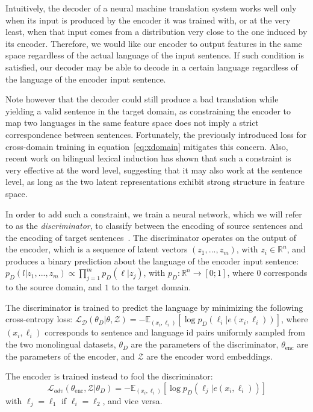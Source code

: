 Intuitively, the decoder of a neural machine translation system works well only when its input is produced by the encoder it was trained with, or at the very least, when that input comes from a distribution very close to the one induced by its encoder. Therefore, we would like our encoder to output features in the same space regardless of the actual language of the input sentence. If such condition is satisfied, our decoder may be able to decode in a certain language regardless of the language of the encoder input sentence.

Note however that the decoder could still produce a bad translation while yielding a valid sentence in the target domain, as constraining the encoder to map two languages in the same feature space does not imply a strict correspondence between sentences. Fortunately, the previously introduced loss for cross-domain training in equation~\ref{eq:xdomain} mitigates this concern. Also, recent work on bilingual lexical induction has shown that such a constraint is very effective at the word level, suggesting that it may also work at the sentence level, as long as the two latent representations exhibit strong structure in feature space.

In order to add such a constraint, we train a neural network, which we will refer to as the \textit{discriminator}, to classify between the encoding of source sentences and the encoding of target sentences~\citep{ganin}. The discriminator operates on the output of the encoder, which is a sequence of latent vectors $(z_1,...,z_m)$, with $z_i \in \mathbb{R}^n$, and produces a binary prediction about the language of the encoder input sentence: $p_D(l | z_1,...,z_m) \propto \prod\limits_{j=1}^m p_D(\ell | z_j)$, with $p_D : \mathbb{R}^n \rightarrow [0;1]$, where $0$ corresponds to the source domain, and $1$ to the target domain. 

The discriminator is trained to predict the language by minimizing the following cross-entropy loss:
$ \mathcal{L_D}(\theta_D | \theta,\mathcal{Z}) = -\mathbb{E}_{(x_i, \ell_i)}[\log p_D(\ell_i | e(x_i, \ell_i))]$, where $(x_i, \ell_i)$ corresponds to sentence and language id pairs uniformly sampled from the two monolingual datasets, $\theta_D$ are the parameters of the discriminator, $\theta_\mathrm{enc}$ are the parameters of the encoder, and $\mathcal{Z}$ are the encoder word embeddings.

The encoder is trained instead to fool the discriminator:
\begin{equation}
\mathcal{L}_{adv}(\theta_\mathrm{enc},\mathcal{Z} | \theta_D) = 
 -\mathbb{E}_{(x_i,\ell_i)}[ \log p_D(\ell_j | e(x_i, \ell_i))]
\end{equation}
with $\ell_j = \ell_1$ if $\ell_i = \ell_2$, and vice versa.

